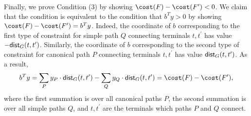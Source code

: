 \documentclass[11pt]{article}
\newcommand{\dist}{\textnormal{\textsf{dist}}}
\begin{document}
    Finally, we prove Condition (3) by showing $\cost(F)-\cost(F^\prime)<0$. We claim that the condition is equivalent to the condition that $b^Ty>0$ by showing $\cost(F)-\cost(F^\prime)=b^Ty$. Indeed, the coordinate of $b$ corresponding to the first type of constraint for simple path $Q$ connecting terminals $t,t^\prime$ has value $-\dist_G(t,t^\prime)$. Similarly, the coordinate of $b$ corresponding to the second type of constraint for canonical path $P$ connecting terminals $t,t^\prime$ has value $\dist_G(t,t^\prime)$. As a result, $$b^Ty=\sum_{P}y_P\cdot \dist_G(t,t^\prime)-\sum_{Q}y_Q\cdot\dist_G(t,t^\prime)=\cost(F)-\cost(F^\prime),$$
    where the first summation is over all canonical paths $P$, the second summation is over all simple paths $Q$, and $t,t^\prime$ are the terminals which paths $P$ and $Q$ connect. 






\end{document}
